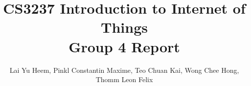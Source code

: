 \documentclass{article}
\begin{document}
\title{CS3237 Introduction to Internet of Things \\ Group 4 Report}
\author{Lai Yu Heem, Pinkl Constantin Maxime, Teo Chuan Kai, Wong Chee Hong, Thomm Leon Felix}
\maketitle
\end{document}
